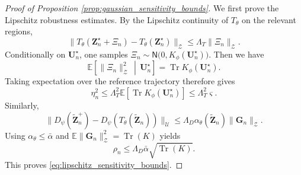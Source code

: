 \documentclass[11pt]{article}
\begin{document}
\begin{proof}[Proof of Proposition \ref{prop:gaussian_sensitivity_bounds}]
We first prove the Lipschitz robustness estimates. By the Lipschitz continuity of $T_\theta$ on the relevant regions,\[
    \|T_\theta(\mathbf Z_n^\star+\Xi_n)
      -T_\theta(\mathbf Z_n^\star)\|_{\mathcal Z}
    \leq
    \Lambda_T\|\Xi_n\|_{\mathcal Z}.
\]
Conditionally on $\mathbf U_n^\star$, one samples  $\Xi_n\sim\mathsf N\bigl(0,K_\phi(\mathbf U_n^\star)\bigr)$.
Then we have
\[
    \mathbb E
    \left[
        \|\Xi_n\|_{\mathcal Z}^2
        \,\middle|\,
        \mathbf U_n^\star
    \right]
    =
    \operatorname{Tr}
    K_\phi(\mathbf U_n^\star).
\]
Taking expectation over the reference trajectory therefore gives
\[
    \eta_n^2
    \leq\Lambda_T^2
    \mathbb E\left[\operatorname{Tr}
    K_\phi(\mathbf U_n^\star)\right]
    \leq\Lambda_T^2\varsigma.
\]
Similarly,
\[
\|D_\psi(\widetilde{\mathbf Z}_n^+) -D_\psi(T_\theta(\widetilde{\mathbf Z}_n))\|_{\mathcal U}\leq\Lambda_D\alpha_\theta(\widetilde{\mathbf Z}_n)\|\mathbf G_n\|_{\mathcal Z}.
\]
Using $\alpha_\theta\leq\bar\alpha$ and
$\mathbb E\|\mathbf G_n\|_{\mathcal Z}^2=\operatorname{Tr}(K)$ yields
\[
    \rho_n
    \leq
    \Lambda_D\bar\alpha\sqrt{\operatorname{Tr}(K)}.
\]
This proves \eqref{eq:lipschitz_sensitivity_bounds}.


\end{proof}
\end{document}
